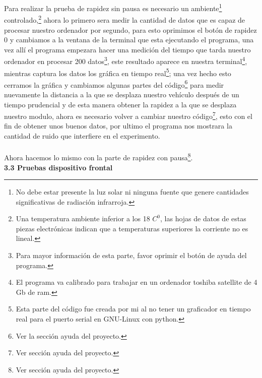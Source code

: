 \documentclass[12]{article}
\begin{document}
\begin{multicols}{2}
Para realizar la prueba de rapidez sin pausa es necesario un ambiente\footnote{No debe estar presente la luz solar ni ninguna fuente que genere cantidades significativas de radiación infrarroja.} controlado,\footnote{Una temperatura ambiente inferior a los 18 $C^{0}$, las hojas de datos de estas piezas electrónicas indican que a temperaturas superiores la corriente no es lineal.} ahora lo primero sera medir la cantidad de datos que es capaz de procesar nuestro ordenador por segundo, para esto oprimimos el botón de rapidez 0 y cambiamos a la ventana de la terminal que esta ejecutando el programa, una vez allí el programa empezara hacer una medición del tiempo que tarda nuestro ordenador en procesar 200 datos\footnote{Para mayor información de esta parte, favor oprimir el botón de ayuda del programa.}, este resultado aparece en nuestra terminal\footnote{El programa va calibrado para trabajar en un ordenador toshiba satellite de 4 Gb de ram.}, mientras captura los datos los gráfica en tiempo real\footnote{Esta parte del código fue creada por mi al no tener un graficador en tiempo real para el puerto serial en GNU-Linux con python.};  una vez hecho esto cerramos la gráfica y cambiamos algunas partes del código\footnote{Ver la sección ayuda del proyecto.} para medir nuevamente  la distancia a la que se desplaza nuestro vehículo después de un tiempo prudencial y de esta manera obtener la rapidez a la que se desplaza nuestro modulo,  ahora es necesario volver a cambiar nuestro código\footnote{Ver sección ayuda del proyecto.}, esto con el fin de obtener unos buenos datos, por ultimo el programa nos mostrara la cantidad de ruido que interfiere en el experimento.  \\\\
Ahora hacemos lo mismo con la parte de rapidez con pausa\footnote{Ver sección ayuda del proyecto.}.\\

{\bf{3.3 Pruebas dispositivo frontal}}\\


\end{multicols}
\end{document}
